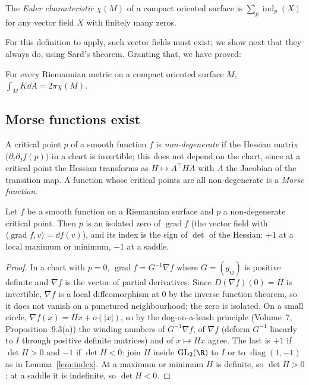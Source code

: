 \begin{definition}
The \emph{Euler characteristic} $\chi(M)$ of a compact oriented surface is $\sum_p\operatorname{ind}_p(X)$ for any vector field $X$ with finitely many zeros.
\end{definition}

For this definition to apply, such vector fields must exist; we show next that they always do, using Sard's theorem. Granting that, we have proved:

\begin{corollary}\label{cor:gaussbonnet}
For every Riemannian metric on a compact oriented surface $M$, $\int_MK\dd A=2\pi\chi(M)$.
\end{corollary}

\subsection*{Morse functions exist}

A critical point $p$ of a smooth function $f$ is \emph{non-degenerate} if the Hessian matrix $\bigl(\partial_i\partial_jf(p)\bigr)$ in a chart is invertible; this does not depend on the
chart, since at a critical point the Hessian transforms as $H\mapsto A^\top HA$ with $A$ the Jacobian of the transition map. A function whose critical points are all
non-degenerate is a \emph{Morse function}.

\begin{lemma}\label{lem:morseindex}
Let $f$ be a smooth function on a Riemannian surface and $p$ a non-degenerate critical point. Then $p$ is an isolated zero of $\operatorname{grad}f$ (the vector field with
$\langle\operatorname{grad}f,v\rangle=\dd f(v)$), and its index is the sign of $\det$ of the Hessian: $+1$ at a local maximum or minimum, $-1$ at a saddle.
\end{lemma}
\begin{proof}
In a chart with $p=0$, $\operatorname{grad}f=G^{-1}\nabla f$ where $G=(g_{ij})$ is positive definite and $\nabla f$ is the vector of partial derivatives. Since $D(\nabla f)(0)=H$ is invertible,
$\nabla f$ is a local diffeomorphism at $0$ by the inverse function theorem, so it does not vanish on a punctured neighbourhood: the zero is isolated. On a small
circle, $\nabla f(x)=Hx+o(|x|)$, so by the dog-on-a-leash principle (Volume~7, Proposition~9.3(a)) the winding numbers of $G^{-1}\nabla f$, of $\nabla f$ (deform $G^{-1}$ linearly to $I$
through positive definite matrices) and of $x\mapsto Hx$ agree. The last is $+1$ if $\det H>0$ and $-1$ if $\det H<0$: join $H$ inside $\mathrm{GL}_2(\R)$ to $I$ or to
$\operatorname{diag}(1,-1)$ as in Lemma~\ref{lem:index}. At a maximum or minimum $H$ is definite, so $\det H>0$; at a saddle it is indefinite, so $\det H<0$.
\end{proof}


